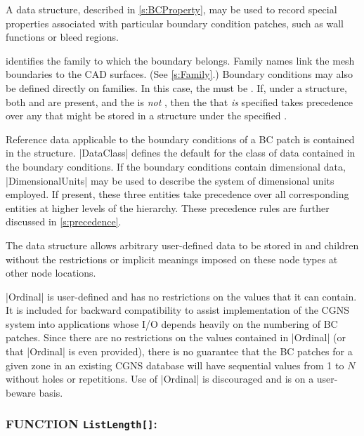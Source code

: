 A  data structure, described in
\autoref{s:BCProperty}, may be used to record special properties
associated with particular boundary condition patches, such as wall
functions or bleed regions.

 identifies the family to which the boundary belongs.
Family names link the mesh boundaries to the CAD surfaces.
(See \autoref{s:Family}.)
Boundary conditions may also be defined directly on families.
In this case, the  must be .
If, under a  structure, both  and
 are present, and the  is \emph{not}
, then the  that \emph{is} specified
takes precedence over any  that might be stored in a
 structure under the specified .

Reference data applicable to the boundary conditions of a BC patch is
contained in the  structure.
|DataClass| defines the default for the class of data contained in the
boundary conditions.
If the boundary conditions contain dimensional data, |DimensionalUnits|
may be used to describe the system of dimensional units employed.
If present, these three entities take precedence over all corresponding
entities at higher levels of the hierarchy.
These precedence rules are further discussed in \autoref{s:precedence}.

The  data structure allows arbitrary
user-defined data to be stored in  and
 children without the restrictions or implicit
meanings imposed on these node types at other node locations.

|Ordinal| is user-defined and has no restrictions on the values that
it can contain.
It is included for backward compatibility to assist implementation of
the CGNS system into applications whose I/O depends heavily on the
numbering of BC patches.
Since there are no restrictions on the values contained in |Ordinal|
(or that |Ordinal| is even provided), there is no guarantee that the
BC patches for a given zone in an existing CGNS database will have
sequential values from 1 to $N$ without holes or repetitions.
Use of |Ordinal| is discouraged and is on a user-beware basis.

\subsubsection*{FUNCTION \texttt{ListLength[]}:}

